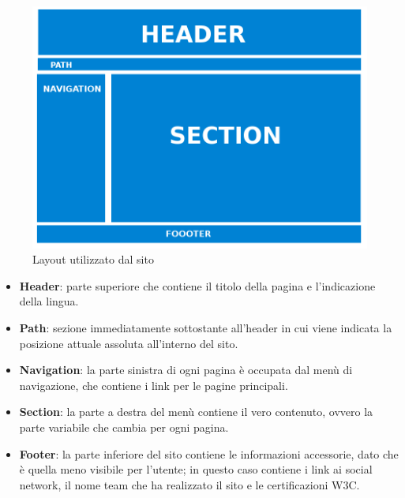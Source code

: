 \documentclass[10pt,a4paper,onecolumn]{article}
\begin{document}
\begin{figure}[h]
\centering
\includegraphics[scale=0.25]{layout}
\caption{Layout utilizzato dal sito}
\label{layoutPic}
\end{figure}

\begin{itemize}
 \item \textbf{Header}: parte superiore che contiene il titolo della pagina e l'indicazione della lingua.
 \item \textbf{Path}: sezione immediatamente sottostante all'header in cui viene indicata la posizione attuale assoluta all'interno del sito.
 \item \textbf{Navigation}: la parte sinistra di ogni pagina è occupata dal menù di navigazione, che contiene i link per le pagine principali.
 \item \textbf{Section}: la parte a destra del menù contiene il vero contenuto, ovvero la parte variabile che cambia per ogni pagina.
 \item \textbf{Footer}: la parte inferiore del sito contiene le informazioni accessorie, dato che è quella meno visibile per l'utente; in questo caso contiene i link ai social network, il nome team che ha realizzato il sito e le certificazioni W3C.
\end{itemize}
\end{document}
